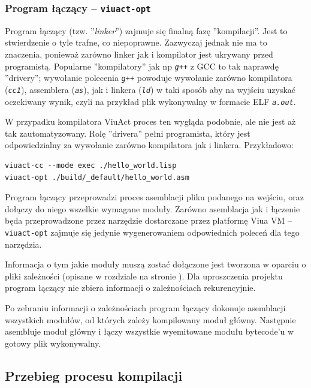 \documentclass[11pt,oneside,a4paper,titlepage,onecolumn]{article}
\begin{document}
\subsubsection{Program łączący -- \texttt{viuact-opt}}
\label{opis_linkera}

Program łączący (tzw. ''\emph{linker}'') zajmuje się finalną fazę ''kompilacji''.
Jest to stwierdzenie o tyle trafne, co niepoprawne. Zazwyczaj jednak nie ma to znaczenia, ponieważ zarówno
linker jak i kompilator jest ukrywany przed programistą. Popularne ''kompilatory'' jak np \emph{\texttt{g++}}
z GCC to tak naprawdę ''drivery''; wywołanie polecenia \emph{\texttt{g++}} powoduje wywołanie zarówno
kompilatora (\emph{\texttt{cc1}}), assemblera (\emph{\texttt{as}}), jak i linkera (\emph{\texttt{ld}}) w taki
sposób aby na wyjściu uzyskać oczekiwany wynik, czyli na przykład plik wykonywalny w formacie
ELF \emph{\texttt{a.out}}.

W przypadku kompilatora ViuAct proces ten wygląda podobnie, ale nie jest aż tak zautomatyzowany.
Rolę ''drivera'' pełni programista, który jest odpowiedzialny za wywołanie zarówno kompilatora jak i linkera.
Przykładowo:

\begin{lstlisting}
viuact-cc --mode exec ./hello_world.lisp
viuact-opt ./build/_default/hello_world.asm
\end{lstlisting}

Program łączący przeprowadzi proces asemblacji pliku podanego na wejściu, oraz dołączy do niego wszelkie
wymagane moduły. Zarówno asemblacja jak i łączenie będa przeprowadzone przez narzędzie dostarczane przez
platformę Viua VM -- \texttt{viuact-opt} zajmuje się jedynie wygenerowaniem odpowiednich poleceń dla tego
narzędzia.

Informacja o tym jakie moduły muszą zostać dołączone jest tworzona w oparciu o pliki zależności (opisane w
rozdziale  na stronie \pageref{pliki_zaleznosci_modulow}).
Dla uproszczenia projektu program łączący nie zbiera informacji o zależnościach rekurencyjnie.

Po zebraniu informacji o zależnościach program łączący dokonuje asemblacji wszystkich modułów, od których
zależy kompilowany moduł główny. Następnie asembluje moduł główny i łączy wszystkie wyemitowane modułu
bytecode'u w gotowy plik wykonywalny.

\subsection{Przebieg procesu kompilacji}
\label{opis_etapow_kompilacji}
\end{document}

